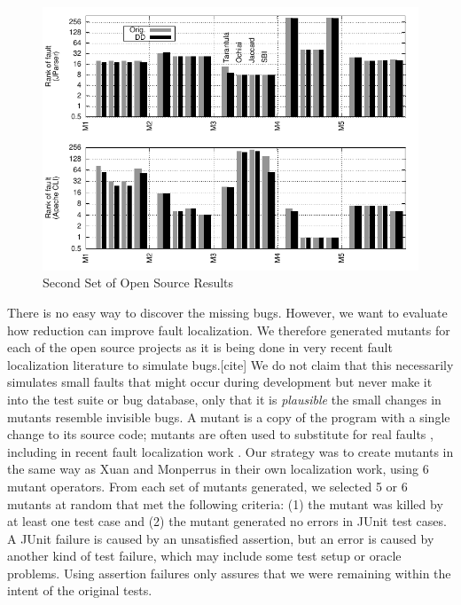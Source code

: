 \begin{figure}[t]
  \centering
  \includegraphics[width=\columnwidth]{opensource2}
  \caption{Second Set of Open Source Results}
  \label{fig:opensource2}
\end{figure}

There is no easy way to discover the missing bugs.  However, we want to evaluate how reduction can improve fault localization.  We therefore generated mutants for
each of the open source projects as it is being done in very recent fault localization literature to simulate bugs.[cite]  We do not claim that this
necessarily simulates small faults that might occur during development
but never make it into the test suite or bug database, only that it is
\emph{plausible} the small changes in mutants resemble invisible bugs.  A
mutant \cite{Mut2000} is a copy of the program with a single change to
its source code; mutants are often used to substitute for real faults
\cite{mutant}, including in recent fault localization work \cite{PureTest}.
Our strategy was to create mutants in the same way as Xuan and
Monperrus \cite{PureTest} in their own localization work, using 6
mutant operators.  From each set of mutants generated, we selected 5
or 6 mutants at random that met the following criteria: (1) the mutant
was killed by at least one test case and (2) the mutant generated no
errors in JUnit test cases.  A JUnit failure is caused by an
unsatisfied assertion, but an error is caused by another kind of test
failure, which may include some test setup or oracle problems.  Using
assertion failures only assures that we were remaining within the
intent of the original tests.

